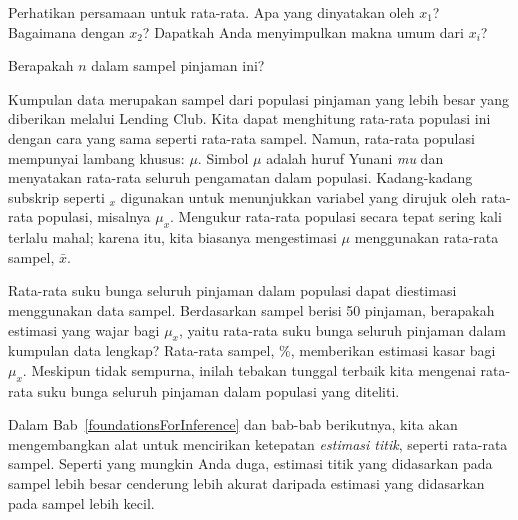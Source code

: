 \begin{exercisewrap}
\begin{nexercise}
Perhatikan persamaan untuk rata-rata.
Apa yang dinyatakan oleh $x_1$? Bagaimana dengan $x_2$?
Dapatkah Anda menyimpulkan makna umum dari
$x_i$?\footnotemark{}
\end{nexercise}
\end{exercisewrap}

\begin{exercisewrap}
\begin{nexercise}
Berapakah $n$ dalam sampel pinjaman
ini?\footnotemark{}
\end{nexercise}
\end{exercisewrap}

Kumpulan data  merupakan sampel dari populasi
pinjaman yang lebih besar yang diberikan melalui Lending Club.
Kita dapat menghitung rata-rata populasi ini dengan cara yang sama
seperti rata-rata sampel.
Namun, rata-rata populasi mempunyai lambang khusus: $\mu$.
Simbol $\mu$ adalah huruf Yunani \emph{mu} dan menyatakan
rata-rata seluruh pengamatan dalam populasi.
Kadang-kadang subskrip seperti $_x$ digunakan untuk menunjukkan
variabel yang dirujuk oleh rata-rata populasi, misalnya $\mu_x$.
Mengukur rata-rata populasi secara tepat sering kali terlalu mahal;
karena itu, kita biasanya mengestimasi $\mu$ menggunakan
rata-rata sampel, $\bar{x}$.


\begin{examplewrap}
\begin{nexample}{Rata-rata suku bunga seluruh pinjaman dalam
    populasi dapat diestimasi menggunakan data sampel.
    Berdasarkan sampel berisi 50 pinjaman, berapakah estimasi
    yang wajar bagi $\mu_x$, yaitu rata-rata suku bunga seluruh
    pinjaman dalam kumpulan data lengkap?}
  Rata-rata sampel, \loanAvg{}\%, memberikan estimasi kasar
  bagi $\mu_x$.
  Meskipun tidak sempurna, inilah tebakan tunggal terbaik kita
  mengenai rata-rata suku bunga seluruh pinjaman dalam
  populasi yang diteliti.

  Dalam Bab~\ref{foundationsForInference} dan bab-bab berikutnya,
  kita akan mengembangkan alat untuk mencirikan ketepatan
  \emph{estimasi titik}, seperti rata-rata sampel.
  Seperti yang mungkin Anda duga, estimasi titik yang didasarkan
  pada sampel lebih besar cenderung lebih akurat daripada
  estimasi yang didasarkan pada sampel lebih kecil.
\end{nexample}
\end{examplewrap}


